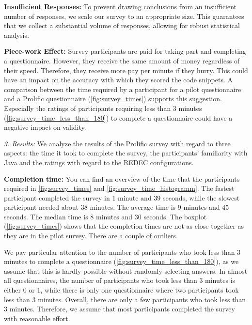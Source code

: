 \documentclass[%
class=scrreprt,
chapterprefix=false,%
open=right,%
twoside=false,%
paper=a4,%
logofile={Logo\_zentral\_farbig\_EN.png},%
thesistype=master,%
UKenglish,%
]{se2thesis}
\theoremstyle{definition}
\newcommand{\rdh}{REDEC\xspace}
\begin{document}
	\textbf{Insufficient Responses:} To prevent drawing conclusions from an insufficient number of responses, we scale our survey to an appropriate size. This guarantees that we collect a substantial volume of responses, allowing for robust statistical analysis.
	
	\textbf{Piece-work Effect:} Survey participants are paid for taking part and completing a questionnaire. However, they receive the same amount of money regardless of their speed. Therefore, they receive more pay per minute if they hurry. This could have an impact on the accuracy with which they scored the code snippets. A comparison between the time required by a participant for a pilot questionnaire and a Prolific questionnaire (\autoref{fig:survey_times}) supports this suggestion. Especially the ratings of participants requiring less than 3 minutes (\autoref{fig:survey_time_less_than_180}) to complete a questionnaire could have a negative impact on validity. 
	
\textit{3. Results:}
	We analyze the results of the Prolific survey with regard to three aspects: the time it took to complete the survey, the participants' familiarity with Java and the ratings with regard to the \rdh configurations.

	\textbf{Completion time:}
	You can find an overview of the time that the participants required in \autoref{fig:survey_times} and \autoref{fig:survey_time_histogramm}.
	The fastest participant completed the survey in 1 minute and 39 seconds, while the slowest participant needed about 38 minutes. 
	The average time is 9 minutes and 45 seconds. The median time is 8 minutes and 30 seconds. The boxplot (\autoref{fig:survey_times}) shows that the completion times are not as close together as they are in the pilot survey. There are a couple of outliers.
	
	We pay particular attention to the number of participants who took less than 3 minutes to complete a questionnaire (\autoref{fig:survey_time_less_than_180}), as we assume that this is hardly possible without randomly selecting answers. In almost all questionnaires, the number of participants who took less than 3 minutes is either 0 or 1, while there is only one questionnaire where two participants took less than 3 minutes.
	Overall, there are only a few participants who took less than 3 minutes. Therefore, we assume that most participants completed the survey with reasonable effort.
		
\end{document}
